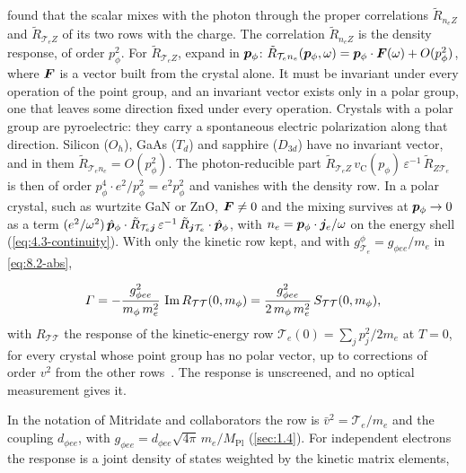  found that the scalar mixes with the photon through the proper correlations $\tilde R_{n_eZ}$ and $\tilde R_{\mathcal{T}_eZ}$ of its two rows with the charge. The correlation $\tilde R_{n_eZ}$ is the density response, of order $p_\phi^2$. For $\tilde R_{\mathcal{T}_eZ}$, expand in $\bm{p}_\phi$: $\tilde R_{\mathcal{T}_en_e}(\bm{p}_\phi,\omega) = \bm{p}_\phi\cdot\bm{F}(\omega) + O(p_\phi^2)$, where $\bm{F}$ is a vector built from the crystal alone. It must be invariant under every operation of the point group, and an invariant vector exists only in a polar group, one that leaves some direction fixed under every operation. Crystals with a polar group are pyroelectric: they carry a spontaneous electric polarization along that direction. Silicon ($O_h$), GaAs ($T_d$) and sapphire ($D_{3d}$) have no invariant vector, and in them $\tilde R_{\mathcal{T}_en_e} = O(p_\phi^2)$. The photon-reducible part $\tilde R_{\mathcal{T}_eZ}\,v_{\mathrm{C}}(p_\phi)\,\varepsilon^{-1}\,\tilde R_{Z\mathcal{T}_e}$ is then of order $p_\phi^4\cdot e^2/p_\phi^2 = e^2p_\phi^2$ and vanishes with the density row. In a polar crystal, such as wurtzite GaN or ZnO, $\bm{F} \ne 0$ and the mixing survives at $\bm{p}_\phi \to 0$ as a term $(e^2/\omega^2)\,\hat{\bm{p}}_\phi\cdot\tilde R_{\mathcal{T}_e\bm{j}}\,\varepsilon^{-1}\,\tilde R_{\bm{j}\mathcal{T}_e}\cdot\hat{\bm{p}}_\phi$, with $n_e = \bm{p}_\phi\cdot\bm{j}_e/\omega$ on the energy shell (\cref{eq:4.3-continuity}). With only the kinetic row kept, and with $g^\phi_{\mathcal{T}_e} = g_{\phi ee}/m_e$ in \cref{eq:8.2-abs},
\begin{keyresult}
\begin{equation}
  \varGamma = -\frac{g_{\phi ee}^2}{m_\phi\,m_e^2}\,\operatorname{Im} R_{\mathcal{T}\mathcal{T}}(0, m_\phi) = \frac{g_{\phi ee}^2}{2\,m_\phi\,m_e^2}\,S_{\mathcal{T}\mathcal{T}}(0, m_\phi) ,
  \label{eq:10.7-scalar}
\end{equation}
with $R_{\mathcal{T}\mathcal{T}}$ the response of the kinetic-energy row $\mathcal{T}_e(0) = \sum_jp_j^2/2m_e$ at $T = 0$, for every crystal whose point group has no polar vector, up to corrections of order $v^2$ from the other rows~\cite[Eqs.~(55) and (56)]{mitridate2021dark}. The response is unscreened, and no optical measurement gives it.
\end{keyresult}
\noindent In the notation of Mitridate and collaborators the row is $\bar v^2 = \mathcal{T}_e/m_e$ and the coupling $d_{\phi ee}$, with $g_{\phi ee} = d_{\phi ee}\sqrt{4\pi}\,m_e/M_{\mathrm{Pl}}$ (\cref{sec:1.4}). For independent electrons the response is a joint density of states weighted by the kinetic matrix elements,
